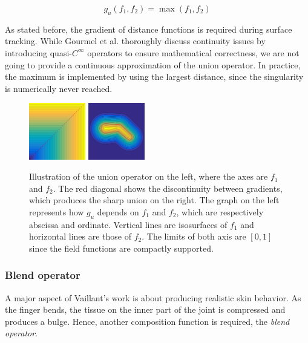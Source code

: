 \documentclass[a4paper,10pt]{article}
\begin{document}
\begin{multicols}{2}
\begin{equation*}
g_u(f_1, f_2) = \max(f_1, f_2)
\end{equation*}

As stated before, the gradient of distance functions is required during surface tracking.
While Gourmel et al. \cite{Gourmel:2013} thoroughly discuss continuity issues by introducing quasi-$C^\infty$ operators to ensure mathematical correctness, we are not going to provide a continuous approximation of the union operator.
In practice, the maximum is implemented by using the largest distance, since the singularity is numerically never reached.

\begin{figure}[H]
\centering
\includegraphics[width=0.22\textwidth]{figs/union_field}
\hfill
\includegraphics[width=0.22\textwidth]{figs/union_finger}
\caption{Illustration of the union operator on the left, where the axes are $f_1$ and $f_2$.
The red diagonal shows the discontinuity between gradients, which produces the sharp union on the right.
The graph on the left represents how $g_u$ depends on $f_1$ and $f_2$, which are respectively abscissa and ordinate.
Vertical lines are isosurfaces of $f_1$ and horizontal lines are those of $f_2$.
The limits of both axis are $[0, 1]$ since the field functions are compactly supported.}
\end{figure}


\subsubsection{Blend operator}
\label{section:blendoperator}

A major aspect of Vaillant's work is about producing realistic skin behavior.
As the finger bends, the tissue on the inner part of the joint is compressed and produces a bulge.
Hence, another composition function is required, the \emph{blend operator}.


\end{multicols}
\end{document}

